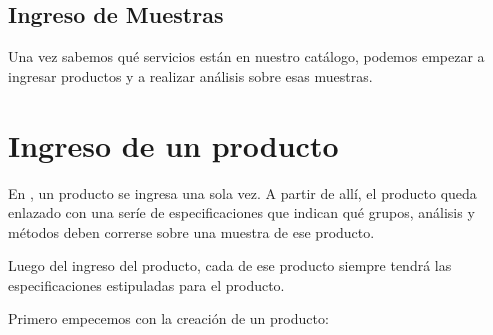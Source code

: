 \documentclass[letterpaper,10pt,spanish]{sphinxmanual}
\begin{document}
\subsection{Ingreso de Muestras}
\label{\detokenize{requerimientos/laboratorio_aceptacion:ingreso-de-muestras}}
Una vez sabemos qué servicios están en nuestro catálogo, podemos empezar
a ingresar productos y a realizar análisis sobre esas muestras.


\section{Ingreso de un producto}
\label{\detokenize{requerimientos/laboratorio_aceptacion:ingreso-de-un-producto}}
En , un producto se ingresa una sola vez. A
partir de allí, el producto queda enlazado con una seríe de
especificaciones que indican qué grupos, análisis y métodos deben
correrse sobre una muestra de ese producto.

Luego del ingreso del producto, cada  de ese producto siempre
tendrá las especificaciones estipuladas para el producto.

Primero empecemos con la creación de un producto:

\begin{sphinxVerbatim}[commandchars=\\\{\}]
  
 
              
       
    
  



  
  
  
  
  
  

\end{sphinxVerbatim}
\end{document}
